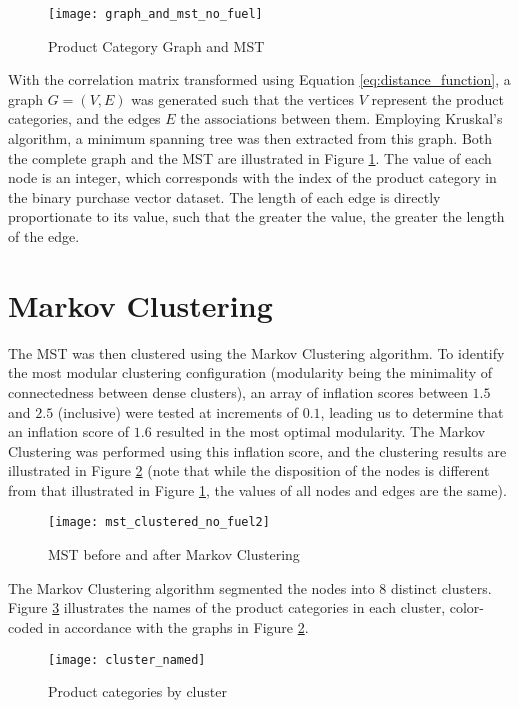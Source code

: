 \begin{figure}[H]
\centering
\texttt{[image: graph\_and\_mst\_no\_fuel]}
\caption{Product Category Graph and MST}
\label{fig:graph_mst}
\end{figure}
With the correlation matrix transformed using Equation \ref{eq:distance_function}, a graph $G = (V,E)$ was generated such that the vertices $V$ represent the product categories, and the edges $E$ the associations between them. Employing Kruskal's algorithm, a minimum spanning tree was then extracted from this graph. Both the complete graph and the MST are illustrated in Figure \ref{fig:graph_mst}. The value of each node is an integer, which corresponds with the index of the product category in the binary purchase vector dataset. The length of each edge is directly proportionate to its value, such that the greater the value, the greater the length of the edge.



\section{Markov Clustering}
The MST was then clustered using the Markov Clustering algorithm. To identify the most modular clustering configuration (modularity being the minimality of connectedness between dense clusters), an array of inflation scores between $1.5$ and $2.5$ (inclusive) were tested at increments of $0.1$, leading us to determine that an inflation score of $1.6$ resulted in the most optimal modularity. The Markov Clustering was performed using this inflation score, and the clustering results are illustrated in Figure \ref{fig:clustered} (note that while the disposition of the nodes is different from that illustrated in Figure \ref{fig:graph_mst}, the values of all nodes and edges are the same). 
\begin{figure}[H]
\centering
\texttt{[image: mst\_clustered\_no\_fuel2]}
\caption{MST before and after Markov Clustering}
\label{fig:clustered}
\end{figure}
The Markov Clustering algorithm segmented the nodes into 8 distinct clusters.
Figure \ref{fig:cluster_named} illustrates the names of the product categories in each cluster, color-coded in accordance with the graphs in Figure \ref{fig:clustered}.

\begin{figure}[H]
\centering
\texttt{[image: cluster\_named]}
\caption{Product categories by cluster}
\label{fig:cluster_named}
\end{figure}

